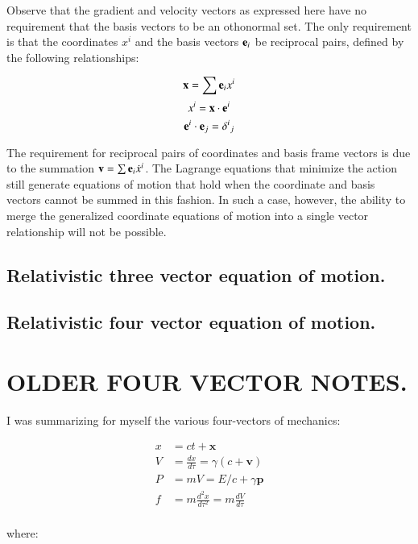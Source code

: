 \documentclass{article}      %
\begin{document}
Observe that the gradient and velocity vectors as expressed here have no requirement that the basis vectors to be an
othonormal set.  The only requirement is that the coordinates $x^i$ and the basis vectors $\mathbf{e}_i$ be reciprocal pairs, defined by the following relationships:

\begin{equation*}
\mathbf{x} = \sum \mathbf{e}_i x^i
\end{equation*}
\begin{equation*}
x^i = \mathbf{x} \cdot \mathbf{e}^i
\end{equation*}
\begin{equation*}
\mathbf{e}^i \cdot \mathbf{e}_j = {\delta^i}_j
\end{equation*}

The requirement for reciprocal pairs of coordinates and basis frame vectors is due to the 
summation $\mathbf{v} = \sum \mathbf{e}_i \dot{x}^i$.  The Lagrange equations that minimize the action still generate equations of
motion that hold when the coordinate and basis vectors cannot be summed in this fashion.
In such a case, however, the ability to merge the generalized coordinate equations of motion into a single
vector relationship will not be possible.

\subsection{ Relativistic three vector equation of motion. }
\subsection{ Relativistic four vector equation of motion. }

\section{ OLDER FOUR VECTOR NOTES. }

I was summarizing for myself the various four-vectors of mechanics:

\begin{align*}
x &= ct + \mathbf{x} \\
V &= \frac{dx}{d\tau} = \gamma(c + \mathbf{v}) \\
P &= m V = E/c + \gamma\mathbf{p} \\
f &= m\frac{d^2 x}{d\tau^2} = m\frac{d V}{d\tau} \\
\end{align*}

where:
\end{document}
